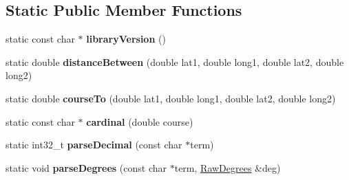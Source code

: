 \subsection*{Static Public Member Functions}
\begin{DoxyCompactItemize}
\item 
static const char $\ast$ {\bfseries library\+Version} ()\hypertarget{class_tiny_g_p_s_plus_a1ec39648e1c80c59f4fded642fdb88ae}{}\label{class_tiny_g_p_s_plus_a1ec39648e1c80c59f4fded642fdb88ae}

\item 
static double {\bfseries distance\+Between} (double lat1, double long1, double lat2, double long2)\hypertarget{class_tiny_g_p_s_plus_add9aef227cf2836b53cbdfed5133bb4d}{}\label{class_tiny_g_p_s_plus_add9aef227cf2836b53cbdfed5133bb4d}

\item 
static double {\bfseries course\+To} (double lat1, double long1, double lat2, double long2)\hypertarget{class_tiny_g_p_s_plus_a82b8fff820573de45c9ae98df3abbdfa}{}\label{class_tiny_g_p_s_plus_a82b8fff820573de45c9ae98df3abbdfa}

\item 
static const char $\ast$ {\bfseries cardinal} (double course)\hypertarget{class_tiny_g_p_s_plus_a68029db9475edf20c750eb0b7a6f1118}{}\label{class_tiny_g_p_s_plus_a68029db9475edf20c750eb0b7a6f1118}

\item 
static int32\+\_\+t {\bfseries parse\+Decimal} (const char $\ast$term)\hypertarget{class_tiny_g_p_s_plus_afd333e29a6a337affc6531183d716e04}{}\label{class_tiny_g_p_s_plus_afd333e29a6a337affc6531183d716e04}

\item 
static void {\bfseries parse\+Degrees} (const char $\ast$term, \hyperlink{struct_raw_degrees}{Raw\+Degrees} \&deg)\hypertarget{class_tiny_g_p_s_plus_ad17b86db786450c5c7249aba98090954}{}\label{class_tiny_g_p_s_plus_ad17b86db786450c5c7249aba98090954}

\end{DoxyCompactItemize}

